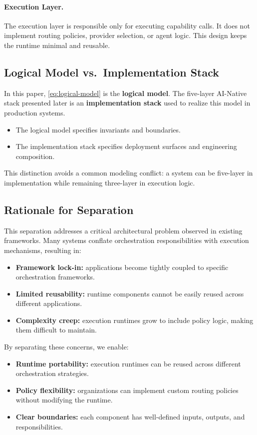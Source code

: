 \paragraph{Execution Layer.}
The execution layer is responsible only for executing capability calls. It does not implement routing policies, provider selection, or agent logic. This design keeps the runtime minimal and reusable.

\subsection{Logical Model vs.\ Implementation Stack}

In this paper, \cref{eq:logical-model} is the \textbf{logical model}. The five-layer AI-Native stack presented later is an \textbf{implementation stack} used to realize this model in production systems.
\begin{itemize}[leftmargin=*,nosep]
  \item The logical model specifies invariants and boundaries.
  \item The implementation stack specifies deployment surfaces and engineering composition.
\end{itemize}

This distinction avoids a common modeling conflict: a system can be five-layer in implementation while remaining three-layer in execution logic.

\subsection{Rationale for Separation}

This separation addresses a critical architectural problem observed in existing frameworks. Many systems conflate orchestration responsibilities with execution mechanisms, resulting in:
\begin{itemize}[leftmargin=*,nosep]
  \item \textbf{Framework lock-in:} applications become tightly coupled to specific orchestration frameworks.
  \item \textbf{Limited reusability:} runtime components cannot be easily reused across different applications.
  \item \textbf{Complexity creep:} execution runtimes grow to include policy logic, making them difficult to maintain.
\end{itemize}

By separating these concerns, we enable:
\begin{itemize}[leftmargin=*,nosep]
  \item \textbf{Runtime portability:} execution runtimes can be reused across different orchestration strategies.
  \item \textbf{Policy flexibility:} organizations can implement custom routing policies without modifying the runtime.
  \item \textbf{Clear boundaries:} each component has well-defined inputs, outputs, and responsibilities.
\end{itemize}
